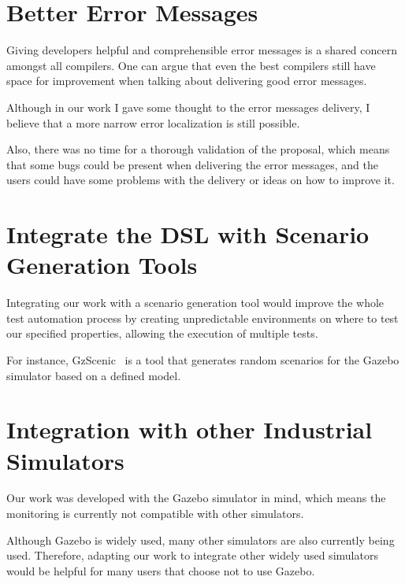 \section{Better Error Messages}
\label{sec:bettererrormsg}

Giving developers helpful and comprehensible error messages is a shared concern amongst all compilers. One can argue that even the best compilers still have space for improvement when talking about delivering good error messages.

Although in our work I gave some thought to the error messages delivery, I believe that a more narrow error localization is still possible.

Also, there was no time for a thorough validation of the proposal, which means that some bugs could be present when delivering the error messages, and the users could have some problems with the delivery or ideas on how to improve it.


\section{Integrate the DSL with Scenario Generation Tools}
\label{sec:integratescenario}

Integrating our work with a scenario generation tool would improve the whole test automation process by creating unpredictable environments on where to test our specified properties, allowing the execution of multiple tests.

For instance, GzScenic~\cite{AfzalGzScenic} is a tool that generates random scenarios for the Gazebo simulator based on a defined model.


\section{Integration with other Industrial Simulators}
\label{sec:integratesimulators}

Our work was developed with the Gazebo simulator in mind, which means the monitoring is currently not compatible with other simulators.

Although Gazebo is widely used, many other simulators are also currently being used. Therefore, adapting our work to integrate other widely used simulators would be helpful for many users that choose not to use Gazebo.


